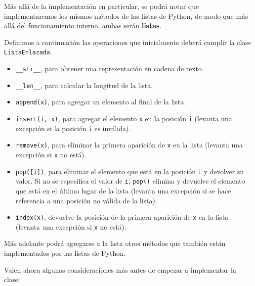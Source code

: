 Más allá de la implementación en particular, se podrá notar que implementaremos
los mismos métodos de las listas de Python, de modo que más allá del
funcionamiento interno, ambas serán {\bf listas}.

Definimos a continuación las operaciones que inicialmente deberá cumplir la
clase \lstinline!ListaEnlazada!.

\begin{itemize}
\item \lstinline|__str__|, para obtener una representación en cadena de texto.

\item \lstinline|__len__|, para calcular la longitud de la lista.

\item \lstinline|append(x)|, para agregar un elemento al final de la lista.

\item \lstinline|insert(i, x)|, para agregar el elemento \lstinline!x! en la
posición \lstinline!i! (levanta una excepción si la posición \lstinline!i! es
inválida).

\item \lstinline|remove(x)|, para eliminar la primera aparición de
\lstinline!x! en la lista (levanta una excepción si \lstinline!x! no está).

\item \lstinline|pop([i])|, para eliminar el elemento que está en la posición
\lstinline!i! y devolver su valor. Si no se especifica el valor de
\lstinline!i!, \lstinline|pop()| elimina y devuelve el elemento que está en
el último lugar de la lista (levanta una excepción si se hace referencia a
una posición no válida de la lista).

\item \lstinline|index(x)|, devuelve la posición de la primera aparición de
\lstinline!x! en la lista (levanta una excepción si \lstinline!x! no está).
\end{itemize}

Más adelante podrá agregarse a la lista otros métodos que también están
implementados por las listas de Python.

Valen ahora algunas consideraciones más antes de empezar a implementar la clase:

